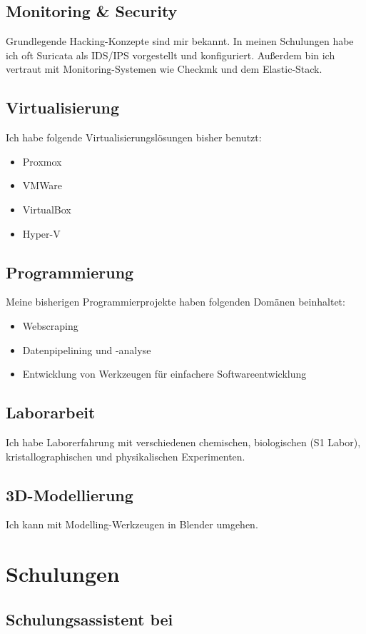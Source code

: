 \documentclass{article}
\begin{document}
\subsection{Monitoring \& Security}
Grundlegende Hacking-Konzepte sind mir bekannt.
In meinen Schulungen habe ich oft Suricata als IDS/IPS vorgestellt und konfiguriert.
Außerdem bin ich vertraut mit Monitoring-Systemen wie Checkmk und dem Elastic-Stack.

\subsection{Virtualisierung}
Ich habe folgende Virtualisierungslösungen bisher benutzt:
\begin{itemize}
	\item Proxmox
	\item VMWare
	\item VirtualBox
	\item Hyper-V
\end{itemize}

\subsection{Programmierung}
Meine bisherigen Programmierprojekte haben folgenden Domänen beinhaltet:
\begin{itemize}
	\item Webscraping
	\item Datenpipelining und -analyse
	\item Entwicklung von Werkzeugen für einfachere Softwareentwicklung
\end{itemize}

\subsection{Laborarbeit}
Ich habe Laborerfahrung mit verschiedenen chemischen, biologischen (S1 Labor), kristallographischen und physikali\-schen Experimenten.

\subsection{3D-Modellierung}
Ich kann mit Modelling-Werkzeugen in Blender umgehen.

\section{Schulungen}

\subsection{Schulungsassistent bei}
\end{document}
